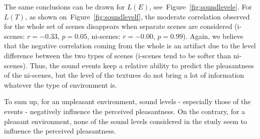 \documentclass[12pt]{elsarticle}
\newcommand{\ie}{\emph{i.\,e.}}
\newcommand{\cf}{cf.}
\begin{document}

The same conclusions can be drawn for $L(E)$, see~Figure~\ref{fig:soundlevele}. For $L(T)$, as shown on~Figure~\ref{fig:soundlevelf}, the moderate correlation observed for the whole set of scenes disappears when separate scenes are considered (i-scenes: $r=-0.33$, $p=0.05$, ni-scenes: $r=-0.00$, $p=0.99$). Again, we believe that the negative correlation coming from the whole is an artifact due to the level difference between the two types of scenes (i-scenes tend to be softer than ni-scenes). Thus, the sound events keep a relative ability to predict the pleasantness of the ni-scenes, but the level of the textures do not bring a lot of information whatever the type of environment is.


To sum up, for an unpleasant environment, sound levels - especially those of the events - negatively influence the perceived pleasantness. On the contrary, for a pleasant environment, none of the sound levels considered in the study seem to influence the perceived pleasantness.

%
\end{document}
